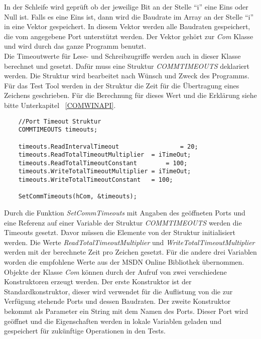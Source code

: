 In der Schleife wird geprüft ob der jeweilige Bit an der Stelle "`i"' eine Eins oder Null ist. Falls es eine Eins ist, dann wird die Baudrate im Array an der Stelle "`i"' in eine Vektor gespeichert. In diesem Vektor werden alle Baudraten gespeichert, die vom angegebene Port unterstützt werden. Der Vektor gehört zur \textit{Com} Klasse und wird durch das ganze Programm benutzt.\\

Die Timeoutwerte für Lese- und Schreibzugriffe werden auch in dieser Klasse berechnet und gesetzt. Dafür muss eine  Struktur \textit{COMMTIMEOUTS} deklariert werden. Die Struktur wird bearbeitet nach Wünsch und Zweck des Programms. Für das Test Tool werden in der Struktur die Zeit für die Übertragung eines Zeichens geschrieben. Für die Berechnung für dieses Wert und die Erklärung siehe bitte Unterkapitel ~\ref{COMWINAPI}.

\begin{lstlisting}
	//Port Timeout Struktur
	COMMTIMEOUTS timeouts;
	
	timeouts.ReadIntervalTimeout				 = 20;
	timeouts.ReadTotalTimeoutMultiplier	 = iTimeOut;
	timeouts.ReadTotalTimeoutConstant		 = 100;
	timeouts.WriteTotalTimeoutMultiplier = iTimeOut;
	timeouts.WriteTotalTimeoutConstant	 = 100;
	
	SetCommTimeouts(hCom, &timeouts);
\end{lstlisting}

Durch die Funktion \textit{SetCommTimeouts} mit Angaben des geöffneten Ports und eine Referenz auf einer Variable der Struktur \textit{COMMTIMEOUTS} werden die Timeouts gesetzt. Davor müssen die Elemente von der Struktur initialisiert werden. Die Werte \textit{ReadTotalTimeoutMultiplier} und \textit{WriteTotalTimeoutMultiplier} werden mit der berechnete Zeit pro Zeichen gesetzt. Für die andere drei Variablen worden die empfohlene Werte aus der MSDN Online Bibliothek\cite{SerialCommunications} übernommen. \\

Objekte der Klasse \textit{Com} können durch der Aufruf von zwei verschiedene Konstruktoren erzeugt werden. Der erste Konstruktor ist der Standardkonstruktor, dieser wird verwendet für die Auflistung von die zur Verfügung stehende Ports und dessen Baudraten. Der zweite Konstruktor bekommt als Parameter ein String mit dem Namen des Ports. Dieser Port wird geöffnet und die Eigenschaften werden in lokale Variablen geladen und gespeichert für zukünftige Operationen in den Tests.
 
\newpage


